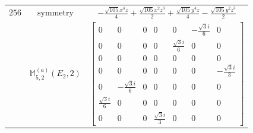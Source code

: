 \documentclass[fleqn,8pt,landscape]{jsarticle}
\begin{document}
\begin{longtable}{ccc}
$ 256 $ & $ \text{symmetry} $ & $ - \frac{\sqrt{105} x^{4} z}{4} + \frac{\sqrt{105} x^{2} z^{3}}{2} + \frac{\sqrt{105} y^{4} z}{4} - \frac{\sqrt{105} y^{2} z^{3}}{2} $ \\
$  $ & $ \mathbb{M}_{5,2}^{(a)}(E_{2},2) $ & $ \begin{bmatrix} 0 & 0 & 0 & 0 & 0 & - \frac{\sqrt{3} i}{6} & 0 \\ 0 & 0 & 0 & 0 & \frac{\sqrt{3} i}{6} & 0 & 0 \\ 0 & 0 & 0 & 0 & 0 & 0 & 0 \\ 0 & 0 & 0 & 0 & 0 & 0 & - \frac{\sqrt{3} i}{3} \\ 0 & - \frac{\sqrt{3} i}{6} & 0 & 0 & 0 & 0 & 0 \\ \frac{\sqrt{3} i}{6} & 0 & 0 & 0 & 0 & 0 & 0 \\ 0 & 0 & 0 & \frac{\sqrt{3} i}{3} & 0 & 0 & 0 \end{bmatrix} $ \\ \hline
\end{longtable}
\end{document}
